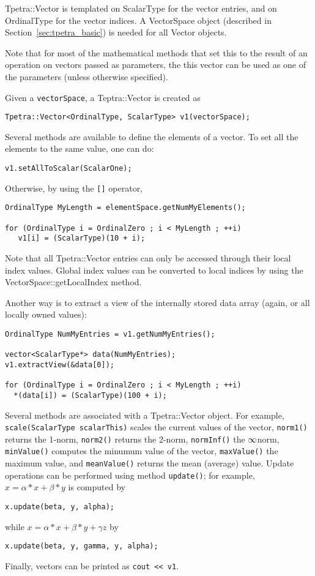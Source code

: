 Tpetra::Vector is templated on ScalarType for the vector entries, and on
OrdinalType for the vector indices. A VectorSpace object 
(described in Section~\ref{sec:tpetra_basic})  is needed for all Vector objects.

 Note that for most of the mathematical methods that set this to the result of
 an operation on vectors passed as parameters, the this vector can be used as
 one of the parameters (unless otherwise specified).

Given a {\tt vectorSpace}, a Teptra::Vector is created as
\begin{verbatim}
Tpetra::Vector<OrdinalType, ScalarType> v1(vectorSpace);
\end{verbatim}
    
Several methods are available to define the elements of a vector. 
To set all the elements to the same value, one can do:
\begin{verbatim}
v1.setAllToScalar(ScalarOne);
\end{verbatim}
Otherwise, by using the \verb![]! operator,
\begin{verbatim}
OrdinalType MyLength = elementSpace.getNumMyElements();

for (OrdinalType i = OrdinalZero ; i < MyLength ; ++i)
   v1[i] = (ScalarType)(10 + i);
\end{verbatim}
Note that all Tpetra::Vector entries can only be accessed through their local
index values.  Global index values can be converted to local indices by using
the VectorSpace::getLocalIndex method.

Another way is to extract a view of the internally stored data array
(again, or all locally owned values):
\begin{verbatim}
OrdinalType NumMyEntries = v1.getNumMyEntries();

vector<ScalarType*> data(NumMyEntries);
v1.extractView(&data[0]); 
                        
for (OrdinalType i = OrdinalZero ; i < MyLength ; ++i)
  *(data[i]) = (ScalarType)(100 + i);
\end{verbatim}

Several methods are associated with a Tpetra::Vector object. For example,
\newline
  \verb!scale(ScalarType scalarThis)! scales the current values of the
  vector, \verb!norm1()! returns the 1-norm, \verb!norm2()! returns the
  2-norm, \verb!normInf()! the $\infty\-$norm, \verb!minValue()! computes the
  minumum value of the vector, \verb!maxValue()! the maximum value, and
  \verb!meanValue()! returns the mean (average) value. Update operations can
  be performed using method \verb!update()!; for example, $x = \alpha * x +
  \beta * y$ is computed by
\begin{verbatim}
x.update(beta, y, alpha); 
\end{verbatim}
while $x = \alpha * x + \beta * y + \gamma z$   by
\begin{verbatim}
x.update(beta, y, gamma, y, alpha); 
\end{verbatim}
Finally, vectors can be printed as \verb!cout << v1!.

